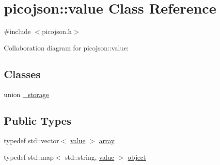 \hypertarget{classpicojson_1_1value}{}\section{picojson\+:\+:value Class Reference}
\label{classpicojson_1_1value}


{\ttfamily \#include $<$picojson.\+h$>$}



Collaboration diagram for picojson\+:\+:value\+:
\subsection*{Classes}
\begin{DoxyCompactItemize}
\item 
union \hyperlink{unionpicojson_1_1value_1_1__storage}{\+\_\+storage}
\end{DoxyCompactItemize}
\subsection*{Public Types}
\begin{DoxyCompactItemize}
\item 
typedef std\+::vector$<$ \hyperlink{classpicojson_1_1value}{value} $>$ \hyperlink{classpicojson_1_1value_adeff4fdf7ee5675eeb7686bb89233c43}{array}
\item 
typedef std\+::map$<$ std\+::string, \hyperlink{classpicojson_1_1value}{value} $>$ \hyperlink{classpicojson_1_1value_a7d7da11d54d7b983a902d28367bda9c1}{object}
\end{DoxyCompactItemize}

